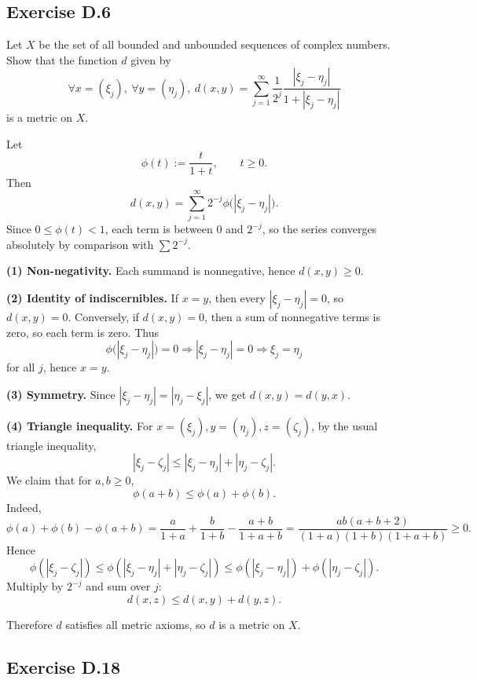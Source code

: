 \documentclass{article}
\begin{document}
\subsection{Exercise D.6}

Let $X$ be the set of all bounded and unbounded sequences of complex
numbers. Show that the function $d$ given by
\[
  \forall x=(\xi_j),\ \forall y=(\eta_j),\
  d(x,y)=\sum_{j=1}^{\infty}\frac{1}{2^j}\frac{|\xi_j-\eta_j|}{1+|\xi_j-\eta_j|}
\]
is a metric on $X$.

\begin{solution}
  Let
  \[
    \phi(t):=\frac{t}{1+t},\qquad t\ge 0.
  \]
  Then
  \[
    d(x,y)=\sum_{j=1}^{\infty}2^{-j}\phi\big(|\xi_j-\eta_j|\big).
  \]
  Since $0\le \phi(t)<1$, each term is between $0$ and $2^{-j}$, so the
  series converges absolutely by comparison with $\sum 2^{-j}$.

  \textbf{(1) Non-negativity.} Each summand is nonnegative, hence
  $d(x,y)\ge 0$.

  \textbf{(2) Identity of indiscernibles.}
  If $x=y$, then every $|\xi_j-\eta_j|=0$, so $d(x,y)=0$.
  Conversely, if $d(x,y)=0$, then a sum of nonnegative terms is zero, so each
  term is zero. Thus
  \[
    \phi\big(|\xi_j-\eta_j|\big)=0 \Rightarrow |\xi_j-\eta_j|=0
    \Rightarrow \xi_j=\eta_j
  \]
  for all $j$, hence $x=y$.

  \textbf{(3) Symmetry.} Since $|\xi_j-\eta_j|=|\eta_j-\xi_j|$, we get
  $d(x,y)=d(y,x)$.

  \textbf{(4) Triangle inequality.}
  For $x=(\xi_j), y=(\eta_j), z=(\zeta_j)$, by the usual triangle inequality,
  \[
    |\xi_j-\zeta_j|\le |\xi_j-\eta_j|+|\eta_j-\zeta_j|.
  \]
  We claim that for $a,b\ge 0$,
  \[
    \phi(a+b)\le \phi(a)+\phi(b).
  \]
  Indeed,
  \[
    \phi(a)+\phi(b)-\phi(a+b)
    = \frac{a}{1+a}+\frac{b}{1+b}-\frac{a+b}{1+a+b}
    = \frac{ab(a+b+2)}{(1+a)(1+b)(1+a+b)}\ge 0.
  \]
  Hence
  \[
    \phi(|\xi_j-\zeta_j|)
    \le \phi(|\xi_j-\eta_j|+|\eta_j-\zeta_j|)
    \le \phi(|\xi_j-\eta_j|)+\phi(|\eta_j-\zeta_j|).
  \]
  Multiply by $2^{-j}$ and sum over $j$:
  \[
    d(x,z)\le d(x,y)+d(y,z).
  \]

  Therefore $d$ satisfies all metric axioms, so $d$ is a metric on $X$.
\end{solution}

\subsection{Exercise D.18}
\end{document}
